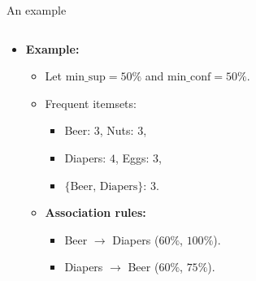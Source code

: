 \documentclass[aspectratio=169,t,xcolor=dvipsnames]{beamer}
\begin{document}
{\begin{frame}{An example}
\begin{columns}
\begin{column}{0.5\textwidth}
\begin{itemize}
            \item \textbf{Example:}
            \begin{itemize}
              \item Let $\text{min\_sup} = 50\%$ and $\text{min\_conf} = 50\%$.
              \item Frequent itemsets:
              \begin{itemize}
                \item Beer: $3$, Nuts: $3$,
                \item Diapers: $4$, Eggs: $3$,
                \item $\{\text{Beer, Diapers}\}$: $3$.
              \end{itemize}
              \item \textbf{Association rules:}
              \begin{itemize}
                \item Beer $\rightarrow$ Diapers ($60\%$, $100\%$).
                \item Diapers $\rightarrow$ Beer ($60\%$, $75\%$).
              \end{itemize}
            \end{itemize}
          \end{itemize}
          \end{column}
        \end{columns}
    \end{frame}
  }
\end{document}
